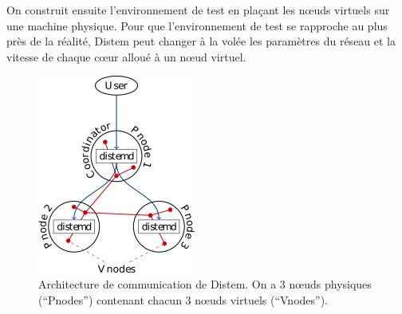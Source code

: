 On construit ensuite l'environnement de test en plaçant les n\oe uds virtuels
sur une machine physique. Pour que l'environnement de test se rapproche au plus
près de la réalité, Distem peut changer à la volée les paramètres du réseau et
la vitesse de chaque c\oe ur alloué à un n\oe ud virtuel.

\begin{figure}
  \centering
  \includegraphics{Pictures/png/Distem_architecture}
  \caption{Architecture de communication de Distem. On a 3 n\oe uds physiques (``Pnodes'') contenant chacun 3 n\oe uds virtuels (``Vnodes'').}
  \label{Distem_archi}
\end{figure}

